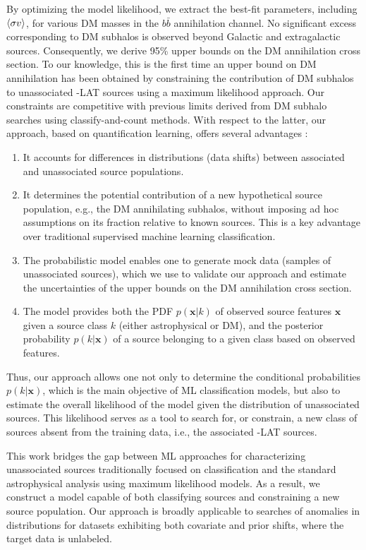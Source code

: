 By optimizing the model likelihood, we extract the best-fit parameters, including $\langle \sigma v \rangle$, for various DM masses in the $b\bar{b}$ annihilation channel.
No significant excess corresponding to DM subhalos is observed beyond Galactic and extragalactic sources.
Consequently, we derive 95\% upper bounds on the DM annihilation cross section. To our knowledge, this is the first time an upper bound on DM annihilation has been obtained by constraining the contribution of DM subhalos to unassociated \Fermi-LAT sources using a maximum likelihood approach.
Our constraints are competitive with previous limits derived from DM subhalo searches using classify-and-count methods.
With respect to the latter, our approach, based on quantification learning, offers several advantages :
\begin{enumerate}[label=(\roman*)]
    \item It accounts for differences in distributions (data shifts) between associated and unassociated source populations.
    \item It determines the potential contribution of a new hypothetical source population, e.g., the DM annihilating subhalos, without imposing ad hoc assumptions on its fraction relative to known sources. This is a key advantage over traditional supervised machine learning classification.
    \item The probabilistic model enables one to generate mock data (samples of unassociated sources), which we use to validate our approach and estimate the uncertainties of the upper bounds on the DM annihilation cross section. 
    \item The model provides both the PDF $p(\mathbf{x}|k)$ of observed source features $\mathbf{x}$ given a source class $k$ (either astrophysical or DM), and the posterior probability $p(k|\mathbf{x})$ of a source belonging to a given class based on observed features.
\end{enumerate}
Thus, our approach allows one not only to determine
the conditional probabilities $p(k|\mathbf{x})$, which is the main objective of ML classification models, but also to estimate the overall likelihood of the model given the distribution of unassociated sources. This likelihood serves as a tool to search for, or constrain, a new class of sources absent from the training data, i.e., the associated \Fermi-LAT sources.

This work bridges the gap between ML approaches for characterizing unassociated sources traditionally focused on classification and the standard astrophysical analysis using maximum likelihood models. As a result, we construct a model capable of both classifying sources and constraining a new source population. 
Our approach is broadly applicable to searches of anomalies in distributions for datasets exhibiting both covariate and prior shifts, where the target data is unlabeled.
